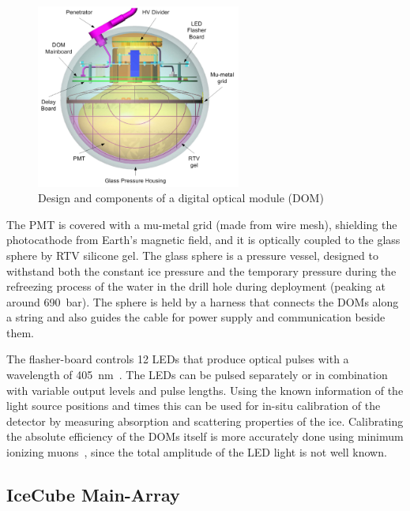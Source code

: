 \begin{figure}
    \includegraphics[width=0.6\textwidth]{figures/icecube_deepcore/DOM_schematic.png}
	\caption[Digital optical module (DOM)]{Design and components of a digital optical module (DOM)~\cite{ABBASI2009294_data_acquisition}}
\end{figure}

The PMT is covered with a mu-metal grid (made from wire mesh), shielding the photocathode from Earth's magnetic field, and it is optically coupled to the glass sphere by RTV silicone gel. The glass sphere is a pressure vessel, designed to withstand both the constant ice pressure and the temporary pressure during the refreezing process of the water in the drill hole during deployment (peaking at around \SI{690}{\bar}). The sphere is held by a harness that connects the DOMs along a string and also guides the cable for power supply and communication beside them.

The flasher-board controls 12 LEDs that produce optical pulses with a wavelength of \SI{405}{\nano\meter}~. The LEDs can be pulsed separately or in combination with variable output levels and pulse lengths. Using the known information of the light source positions and times this can be used for in-situ calibration of the detector by measuring absorption and scattering properties of the ice. Calibrating the absolute efficiency of the DOMs itself is more accurately done using minimum ionizing muons~, since the total amplitude of the LED light is not well known.


\subsection{IceCube Main-Array} 

